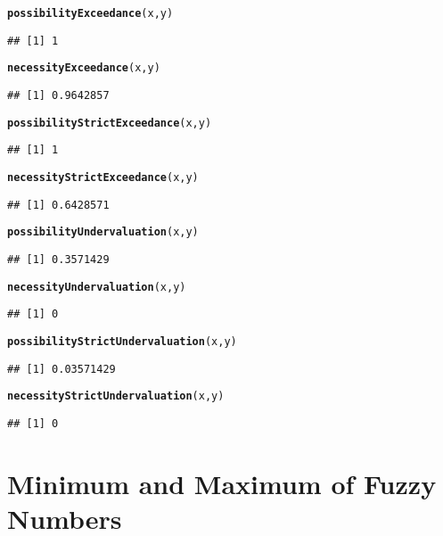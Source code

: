 \documentclass[11pt]{article}\usepackage[]{graphicx}\usepackage[]{color}
\makeatletter
\newcommand{\hlstd}[1]{\textcolor[rgb]{0.345,0.345,0.345}{#1}}%
\newcommand{\hlkwd}[1]{\textcolor[rgb]{0.737,0.353,0.396}{\textbf{#1}}}%
\newenvironment{kframe}{%
 \def\at@end@of@kframe{}%
 \ifinner\ifhmode%
  \def\at@end@of@kframe{\end{minipage}}%
  \begin{minipage}{\columnwidth}%
 \fi\fi%
 \def\FrameCommand##1{\hskip\@totalleftmargin \hskip-\fboxsep
 \colorbox{shadecolor}{##1}\hskip-\fboxsep
     \hskip-\linewidth \hskip-\@totalleftmargin \hskip\columnwidth}%
 \MakeFramed {\advance\hsize-\width
   \@totalleftmargin\z@ \linewidth\hsize
   \@setminipage}}%
 {\par\unskip\endMakeFramed%
 \at@end@of@kframe}
\newenvironment{knitrout}{}{} %
\makeatother
\begin{document}
\begin{knitrout}
\begin{kframe}\begin{alltt}
\hlkwd{possibilityExceedance}\hlstd{(x,y)}
\end{alltt}
\begin{verbatim}
## [1] 1
\end{verbatim}
\begin{alltt}
\hlkwd{necessityExceedance}\hlstd{(x,y)}
\end{alltt}
\begin{verbatim}
## [1] 0.9642857
\end{verbatim}
\begin{alltt}
\hlkwd{possibilityStrictExceedance}\hlstd{(x,y)}
\end{alltt}
\begin{verbatim}
## [1] 1
\end{verbatim}
\begin{alltt}
\hlkwd{necessityStrictExceedance}\hlstd{(x,y)}
\end{alltt}
\begin{verbatim}
## [1] 0.6428571
\end{verbatim}
\begin{alltt}
\hlkwd{possibilityUndervaluation}\hlstd{(x,y)}
\end{alltt}
\begin{verbatim}
## [1] 0.3571429
\end{verbatim}
\begin{alltt}
\hlkwd{necessityUndervaluation}\hlstd{(x,y)}
\end{alltt}
\begin{verbatim}
## [1] 0
\end{verbatim}
\begin{alltt}
\hlkwd{possibilityStrictUndervaluation}\hlstd{(x,y)}
\end{alltt}
\begin{verbatim}
## [1] 0.03571429
\end{verbatim}
\begin{alltt}
\hlkwd{necessityStrictUndervaluation}\hlstd{(x,y)}
\end{alltt}
\begin{verbatim}
## [1] 0
\end{verbatim}
\end{kframe}
\end{knitrout}

\section{Minimum and Maximum of Fuzzy Numbers}
\end{document}
